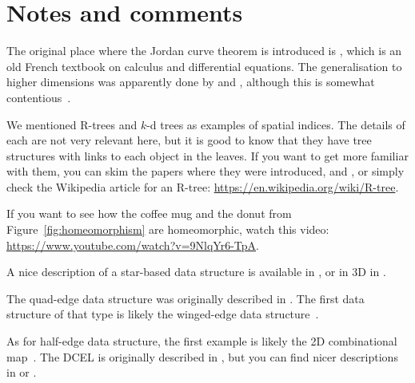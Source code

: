 %
\section{Notes and comments}

The original place where the Jordan curve theorem is introduced is  \citet{Jordan87}, which is an old French textbook on calculus and differential equations.
The generalisation to higher dimensions was apparently done by \citet{Lebesgue11} and \citet{Brouwer11}, although this is somewhat contentious~\citep[Ch.~5]{van-Dalen13}.

We mentioned R-trees and \(k\)-d trees as examples of spatial indices.
The details of each are not very relevant here, but it is good to know that they have tree structures with links to each object in the leaves.
If you want to get more familiar with them, you can skim the papers where they were introduced, \citet{Guttman84} and \citet{Bentley75}, or simply check the Wikipedia article for an R-tree: \url{https://en.wikipedia.org/wiki/R-tree}.

If you want to see how the coffee mug and the donut from Figure~\ref{fig:homeomorphism} are homeomorphic, watch this video: \url{https://www.youtube.com/watch?v=9NlqYr6-TpA}.

A nice description of a star-based data structure is available in \citet{Blandford05}, or in 3D in \citet{Ledoux13a}.

The quad-edge data structure was originally described in \citet{Guibas85}.
The first data structure of that type is likely the winged-edge data structure~\citet{Baumgart75}.

As for half-edge data structure, the first example is likely the 2D combinational map~\citep{Edmonds60}.
The DCEL is originally described in \citet{Muller78}, but you can find nicer descriptions in \citet{Worboys04} or \citet{deBerg08}.
